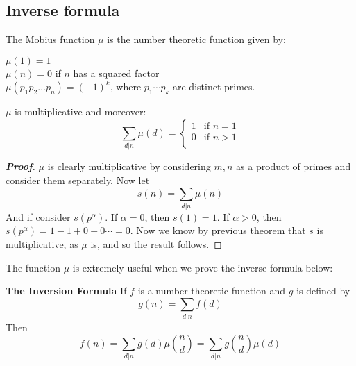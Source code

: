 \subsection{Inverse formula}
\begin{definition} The M$\ddot{\text{o}}$bius function $\mu$ is the number theoretic function given by:
\begin{flushleft}
$\mu(1)=1$\\
$\mu(n)=0$ if $n$ has a squared factor\\
$\mu(p_1 p_2 \ldots p_n)=(-1)^k$, where $p_1 \cdots p_k$ are distinct primes.
\end{flushleft}
\end{definition}
\begin{lemma} $\mu$ is multiplicative and moreover:
\begin{equation*}
\sum_{d|n}\mu(d)= \left\{
\begin{array}{ll}
1 & \text{if } n=1\\
0 & \text{if } n>1\\
\end{array} \right.
\end{equation*}
\end{lemma}
\begin{proof}[\bf Proof] $\mu$ is clearly multiplicative by considering $m,n$ as a product of primes and consider them separately. Now let \begin{equation*} s(n)=\sum_{d|n}\mu(n) \end{equation*} And if consider $s(p^\alpha)$. If $\alpha=0$, then $s(1)=1$. If $\alpha > 0$, then $s(p^\alpha)=1 - 1 + 0 +0 \cdots =0$. Now we know by previous theorem that $s$ is multiplicative, as $\mu$ is, and so the result follows.
\end{proof}
The function $\mu$ is extremely useful when we prove the inverse formula below:
\begin{theorem}{\bf The Inversion Formula}\label{I;Inversion} If $f$ is a number theoretic function and $g$ is defined by
\begin{equation*} g(n)=\sum_{d|n}f(d) \end{equation*}
Then \begin{equation*} f(n)=\sum_{d|n}g(d) \mu \left(\frac{n}{d}\right)=\sum_{d|n}g \left(\frac{n}{d}\right) \mu(d) \end{equation*}
\end{theorem}
